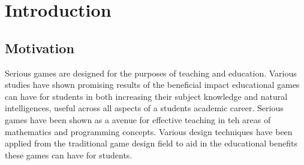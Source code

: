 \documentclass{l4proj}
\begin{document}
%
%
%
%
%
%
%
%
\chapter{Introduction}


\section{Motivation}
Serious games are designed for the purposes of teaching and education. Various studies have shown promising results of the beneficial impact educational games can have for students in both increasing their subject knowledge and natural intelligences, useful across all aspects of a students academic career. Serious games have been shown as a avenue for effective teaching in teh areas of mathematics and programming concepts. Various design techniques have been applied from the traditional game design field to aid in the educational benefits these games can have for students.
\end{document}
